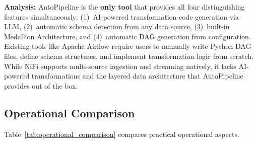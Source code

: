 \documentclass[12pt, a4paper]{article}
\begin{document}
\textbf{Analysis:} AutoPipeline is the \textbf{only tool} that provides all four distinguishing features simultaneously: (1)~AI-powered transformation code generation via LLM, (2)~automatic schema detection from any data source, (3)~built-in Medallion Architecture, and (4)~automatic DAG generation from configuration. Existing tools like Apache Airflow require users to manually write Python DAG files, define schema structures, and implement transformation logic from scratch. While NiFi supports multi-source ingestion and streaming natively, it lacks AI-powered transformations and the layered data architecture that AutoPipeline provides out of the box.


\subsection{Operational Comparison}

Table~\ref{tab:operational_comparison} compares practical operational aspects.

\begin{table}[H]
\centering
\caption{Operational comparison of data pipeline tools}
\label{tab:operational_comparison}
\renewcommand{\arraystretch}{1.3}
\end{table}
\end{document}
